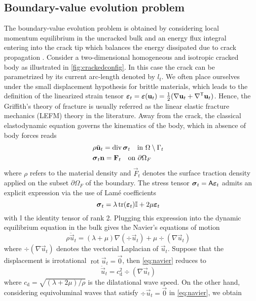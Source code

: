 \subsection{Boundary-value evolution problem}
The boundary-value evolution problem is obtained by considering local momentum equilibrium in the uncracked bulk and an energy flux integral entering into the crack tip which balances the energy dissipated due to crack propagation \cite{NakamuraShihFreund:1985,Cherepanov:1989}. Consider a two-dimensional homogeneous and isotropic cracked body as illustrated in \cref{fig:crackedconfig}. In this case the crack can be parametrized by its current arc-length denoted by $l_t$. We often place ourselves under the small displacement hypothesis for brittle materials, which leads to the definition of the linearized strain tensor $\eps_t=\eps(\vec{u}_t)=\frac{1}{2}(\nabla\vec{u}_t+\nabla^\mT\vec{u}_t)$. Hence, the Griffith's theory of fracture is usually referred as the linear elastic fracture mechanics (LEFM) theory in the literature. Away from the crack, the classical elastodynamic equation governs the kinematics of the body, which in absence of body forces reads
\begin{equation} \label{eq:elastogriffith}
\begin{aligned}
& \rho\ddot{\vec{u}}_t=\div\sig_t\quad\text{in $\Omega\setminus\Gamma_t$} \\
& \sig_t\vec{n}=\vec{F}_t\quad\text{on $\partial\Omega_F$}
\end{aligned}
\end{equation}
where $\rho$ refers to the material density and $\vec{F}_t$ denotes the surface traction density applied on the subset $\partial\Omega_F$ of the boundary. The stress tensor $\sig_t=\tens{A}\eps_t$ admits an explicit expression via the use of Lamé coefficients
\[
\sig_t=\lambda\tr(\eps_t)\mathbb{I}+2\mu\eps_t
\]
with $\mathbb{I}$ the identity tensor of rank 2. Plugging this expression into the dynamic equilibrium equation in the bulk gives the Navier's equations of motion
\begin{equation} \label{eq:navier}
\rho\ddot{\vec{u}}_t=(\lambda+\mu)\nabla(\div\vec{u}_t)+\mu\div(\nabla\vec{u}_t)
\end{equation}
where $\div(\nabla\vec{u}_t)$ denotes the vectorial Laplacian of $\vec{u}_t$. Suppose that the displacement is irrotational $\operatorname{rot}\vec{u}_t=\vec{0}$, then \eqref{eq:navier} reduces to
\[
\ddot{\vec{u}}_t=c_\mathrm{d}^2\div(\nabla\vec{u}_t)
\]
where $c_\mathrm{d}=\sqrt{(\lambda+2\mu)/\rho}$ is the dilatational wave speed. On the other hand, considering equivoluminal waves that satisfy $\div\vec{u}_t=\vec{0}$ in \eqref{eq:navier}, we obtain
